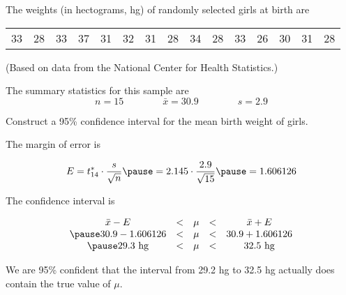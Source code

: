 \documentclass{beamer}
\begin{document}
\begin{frame}
  \begin{example}
    The weights (in hectograms, hg) of randomly selected girls at birth are

    \vspace{-7mm}
    \begin{center}
      {%
      \vspace{4.5mm}
      \setlength{\tabcolsep}{.4em}
      \begin{tabular}{ccccccccccccccc}
        33 & 28 & 33 & 37 & 31 & 32 & 31 & 28 & 34 & 28 & 33 & 26 & 30 & 31 & 28
      \end{tabular}
      }
    \end{center}

    \vspace{-3mm}
    (Based on data from the National Center for Health Statistics.)\pause

    \vspace{1mm}
    The summary statistics for this sample are
    \vspace{-3mm}
    \begin{equation*}
      n = 15
      \qquad\qquad \bar{x} = 30.9
      \qquad\qquad s  = 2.9
    \end{equation*}\pause

    \vspace{-8mm}
    Construct a 95\% confidence interval for the mean birth weight of girls.\pause

    \vspace{1mm}
    The margin of error is

    \vspace{-3mm}
    \begin{equation*}
      E=t^*_{14}\cdot\dfrac{s}{\sqrt{n}}\pause
      =2.145\cdot\dfrac{2.9}{\sqrt{15}}\pause
      =1.606126
    \end{equation*}\pause

    \vspace{-4mm}
    The confidence interval is

    \vspace{-3mm}
    \begin{equation*}
      \begin{matrix}
        \bar{x} - E &<& \mu &<& \bar{x} + E\\\pause
        30.9 - 1.606126 &<& \mu &<& 30.9 + 1.606126 \\\pause
        29.3~\text{hg} &<& \mu &<& 32.5~\text{hg} \\
      \end{matrix}
    \end{equation*}\pause

    \vspace{-3mm}
    We are 95\% confident that the interval from 29.2 hg to 32.5 hg actually does contain the true value of $\mu$.
  \end{example}
\end{frame}
\end{document}
